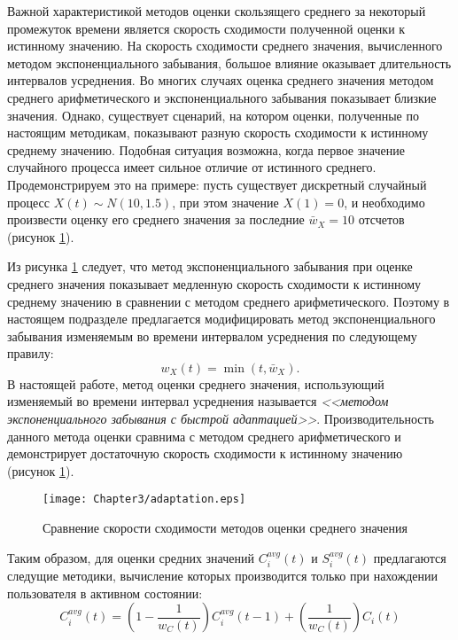 Важной характеристикой методов оценки скользящего среднего за некоторый промежуток времени является скорость сходимости полученной оценки к истинному значению. На скорость сходимости среднего значения, вычисленного методом экспоненциального забывания, большое влияние оказывает длительность интервалов усреднения. Во многих случаях оценка среднего значения методом среднего арифметического и экспоненциального забывания показывает близкие значения. Однако, существует сценарий, на котором оценки, полученные по настоящим методикам, показывают разную скорость сходимости к истинному среднему значению. Подобная ситуация возможна, когда первое значение случайного процесса имеет сильное отличие от истинного среднего. Продемонстрируем это на примере: пусть существует дискретный случайный процесс $X(t) \sim N(10,1.5)$, при этом значение $X(1) = 0$, и необходимо произвести оценку его среднего значения за последние $\bar{w}_{X} = 10$ отсчетов (рисунок \ref{fig:adaptation}).

Из рисунка \ref{fig:adaptation} следует, что метод экспоненциального забывания при оценке среднего значения показывает медленную скорость сходимости к истинному среднему значению в сравнении с методом среднего арифметического. Поэтому в настоящем подразделе предлагается модифицировать метод экспоненциального забывания изменяемым во времени интервалом усреднения по следующему правилу:
$$w_{X}(t) = \min(t, \bar{w}_{X}).$$
В настоящей работе, метод оценки среднего значения, использующий изменяемый во времени интервал усреднения называется \textit{<<методом экспоненциального забывания с быстрой адаптацией>>}. Производительность данного метода оценки сравнима с методом среднего арифметического и демонстрирует достаточную скорость сходимости к истинному значению (рисунок \ref{fig:adaptation}).

\begin{figure}[htbp]
\begin{center}
\texttt{[image: Chapter3/adaptation.eps]}
\caption{Сравнение скорости сходимости методов оценки среднего значения}
\label{fig:adaptation}
\end{center}
\end{figure}

Таким образом, для оценки средних значений $C_i^{avg}(t)$ и $S_i^{avg}(t)$ предлагаются следущие методики, вычисление которых производится только при нахождении пользователя в активном состоянии:
\begin{equation}
\label{eq:CEstimation}
C_i^{avg}(t) = \left(1 - \frac{1}{w_{C}(t)}\right)C_i^{avg}(t - 1) + \left(\frac{1}{w_{C}(t)}\right)C_i(t)
\end{equation}

